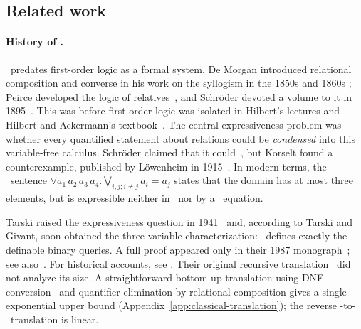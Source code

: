 \subsection{Related work}\label{sec:relwork}

\paragraph{History of \CoR.}
\CoR\ predates first-order logic as a formal
system. De Morgan introduced relational composition and converse in his
work on the syllogism in the 1850s and 1860s
\citep{demorgan1856,demorgan1864}; Peirce developed the logic of
relatives~\citep{peirce1870,peirce1880}, and Schr\"oder devoted a volume
to it in 1895~\citep{schroeder1895}. This was before first-order logic
was isolated in Hilbert's lectures and Hilbert and Ackermann's
textbook~\citep{hilbert-lectures,hilbert-ackermann1928,moore1988}.
The central expressiveness problem was whether every quantified statement
about relations could be \emph{condensed} into this variable-free calculus.
Schr\"oder claimed that it could~\citep[p.~551]{schroeder1895}, but
Korselt found a counterexample, published by L\"owenheim in
1915~\citep{loewenheim1915,loewenheim1967}. In modern terms, the \FOfour\ sentence
$
\forall a_1\,a_2\,a_3\,a_4.\bigvee_{i,j; i\neq j} a_i = a_j
$
states that the domain has at most three elements, but is expressible
neither in \FOthree\ nor by a \CoR\ equation.

Tarski raised the expressiveness question in 1941~\citep{tarski1941}
and, according to Tarski and Givant, soon obtained the three-variable
characterization: \CoR\ defines exactly the \FOthree-definable binary
queries. A full proof appeared only in their 1987
monograph~\citep{tarski-givant1987}; see
also~\citep{maddux2006}. For historical accounts, see
\citep{pratt1992,maddux1991,burris-legris,brady2000}.
Their original recursive translation~\citep[\S3.9]{tarski-givant1987}
did not analyze its size. A straightforward bottom-up translation using
DNF conversion~\citep{hilbert-ackermann1928,kleene1952,schoening1989}
and quantifier elimination by relational composition gives a
single-exponential upper bound (Appendix~\ref{app:classical-translation});
the reverse \CoR-to-\FOthree\ translation is linear.


